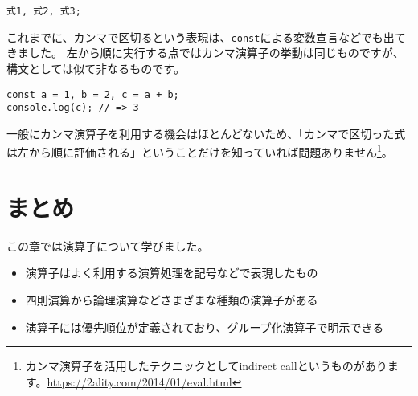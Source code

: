 \begin{lstlisting}
式1, 式2, 式3;
\end{lstlisting}

これまでに、カンマで区切るという表現は、\texttt{const}による変数宣言などでも出てきました。
左から順に実行する点ではカンマ演算子の挙動は同じものですが、構文としては似て非なるものです。

\begin{lstlisting}
const a = 1, b = 2, c = a + b;
console.log(c); // => 3
\end{lstlisting}

一般にカンマ演算子を利用する機会はほとんどないため、「カンマで区切った式は左から順に評価される」ということだけを知っていれば問題ありません\footnote{カンマ演算子を活用したテクニックとしてindirect
  callというものがあります。\url{https://2ality.com/2014/01/eval.html}}。

\hypertarget{conclusion}{%
\section{まとめ}\label{conclusion}}

この章では演算子について学びました。

\begin{itemize}
\item
  演算子はよく利用する演算処理を記号などで表現したもの
\item
  四則演算から論理演算などさまざまな種類の演算子がある
\item
  演算子には優先順位が定義されており、グループ化演算子で明示できる
\end{itemize}
